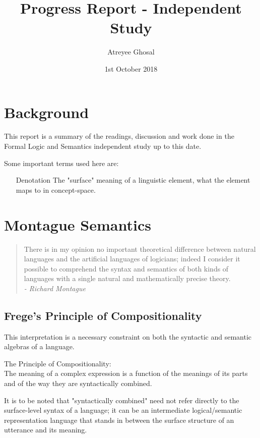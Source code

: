 \documentclass[letterpaper,12pt]{article}
\begin{document}
\title{Progress Report - Independent Study}
\author{Atreyee Ghosal}
\date{1st October 2018}
\maketitle

\section{Background}

This report is a summary of the readings, discussion and work done in the Formal Logic and Semantics independent study up to this date.

Some important terms used here are:

\begin{itemize}
\item[Denotation]
The "surface" meaning of a linguistic element, what the element maps to in concept-space.
\end{itemize}

\section{Montague Semantics}

\begin{quote}
	There is in my opinion no important theoretical difference between natural languages and the artificial languages of logicians; indeed I consider it possible to comprehend the syntax and semantics of both kinds of languages with a single natural and mathematically precise theory. \\
\textit{- Richard Montague}
\end{quote}

\subsection{Frege's Principle of Compositionality}

This interpretation is a necessary constraint on both the syntactic and semantic algebras of a language.

The Principle of Compositionality:\\
The meaning of a complex expression is a function of the meanings of its parts and of the way they are syntactically combined.

It is to be noted that "syntactically combined" need not refer directly to the surface-level syntax of a language; it can be an intermediate logical/semantic representation language that stands in between the surface structure of an utterance and its meaning.
\end{document}
